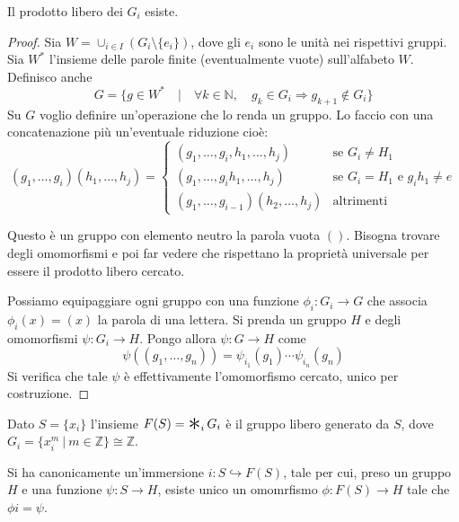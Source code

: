 \begin{prop}
    Il prodotto libero dei $G_i$ esiste.
\end{prop}
\begin{proof}
    Sia $W = \cup_{i\in I}(G_i\setminus \{e_i\})$, dove gli $e_i$ sono le unit\`a nei rispettivi gruppi. Sia $W^*$ l'insieme delle parole finite (eventualmente vuote) sull'alfabeto $W$. Definisco anche
        \[
        G = \{g \in W^* \quad | \quad \forall k \in \mathbb{N},\quad g_k\in G_i \Rightarrow g_{k+1} \notin G_i\}
        \]
        Su $G$ voglio definire un'operazione che lo renda un gruppo. Lo faccio con una concatenazione pi\`u un'eventuale riduzione cio\`e:
        \[
        (g_1, \dots, g_i)(h_1,\dots, h_j) =
        \begin{cases}
            (g_1, \dots, g_i, h_1, \dots, h_j) & \text{se $G_i \neq H_1$}\\
            (g_1, \dots, g_ih_1, \dots, h_j) & \text{se $G_i = H_1$ e $g_ih_1 \neq e$}\\
            (g_1, \dots, g_{i-1})(h_2, \dots, h_j) & \text{altrimenti}

        \end{cases}
        \]

        Questo \`e un gruppo con elemento neutro la parola vuota $()$. Bisogna trovare degli omomorfismi e poi far vedere che rispettano la propriet\`a universale per essere il prodotto libero cercato.

        Possiamo equipaggiare ogni gruppo con una funzione $\phi_i\colon G_i\longrightarrow G$ che associa $\phi_i(x)=(x)$ la parola di una lettera. Si prenda un gruppo $H$ e degli omomorfismi $\psi\colon G_i\longrightarrow H$. Pongo allora $\psi\colon G\longrightarrow H$ come
        \[
            \psi((g_1, \dots, g_n)) = \psi_{i_1}(g_1)\cdots\psi_{i_n}(g_n)
        \]
        Si verifica che tale $\psi$ \`e effettivamente l'omomorfismo cercato, unico per costruzione.
\end{proof}

\begin{defn}
    Dato $S=\{x_i\}$ l'insieme $F(S)=\Conv_i G_i$ \`e il gruppo libero generato da $S$, dove $G_i=\{x_i^m \ |\ m\in\mathbb{Z}\}\cong \mathbb{Z}$.
\end{defn}

\begin{oss}
    Si ha canonicamente un'immersione $i\colon S\hookrightarrow F(S)$, tale per cui, preso un gruppo $H$ e una funzione $\psi\colon S \rightarrow H$, esiste unico un omomrfismo $\phi\colon F(S)\rightarrow H$ tale che $\phi i = \psi$.
\end{oss}

